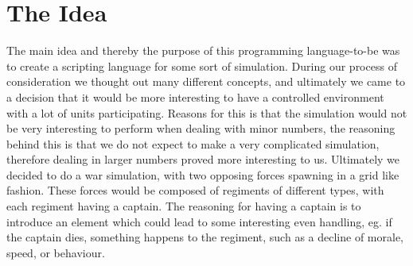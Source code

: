 \section{The Idea}
The main idea and thereby the purpose of this programming language-to-be was to create a scripting language for some sort of simulation. During our process of consideration we thought out many different concepts, and ultimately we came to a decision that it would be more interesting to have a controlled environment with a lot of units participating. Reasons for this is that the simulation would not be very interesting to perform when dealing with minor numbers, the reasoning behind this is that we do not expect to make a very complicated simulation, therefore dealing in larger numbers proved more interesting to us. \newline
Ultimately we decided to do a war simulation, with two opposing forces spawning in a grid like fashion. These forces would be composed of regiments of different types, with each regiment having a captain. The reasoning for having a captain is to introduce an element which could lead to some interesting even handling, eg. if the captain dies, something happens to the regiment, such as a decline of morale, speed, or behaviour.